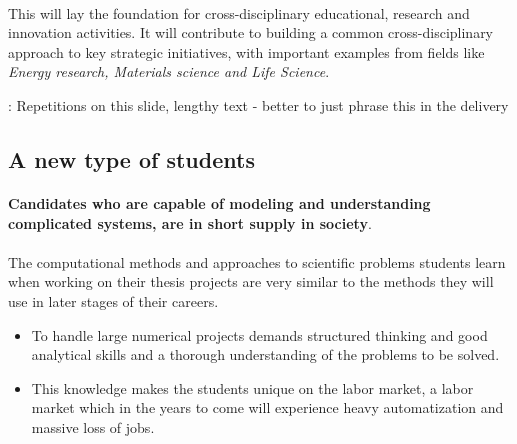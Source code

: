 \documentclass[%
oneside,                 %
final,                   %
10pt]{article}
\newcommand{\shortinlinecomment}[3]{{\color{red}{\bf #1}: #2}}
\begin{document}
\paragraph{}
This will lay the foundation for cross-disciplinary
educational, research and innovation activities. It will contribute to building a common cross-disciplinary
approach to key strategic initiatives, with important examples from fields like  \emph{Energy research, Materials science and  Life Science}.



\shortinlinecomment{hpl 2}{ Repetitions on this slide, lengthy text - better to just phrase this in the delivery }{ Repetitions on this slide, }




\subsection{A new type of students}

\paragraph{}
\textbf{Candidates who are capable of modeling and understanding complicated
systems, are in short supply in society}.



\paragraph{}
The computational methods and approaches to scientific problems students learn
when working on their thesis projects are very similar to the methods
they will use in later stages of their careers.
\begin{itemize}
\item To handle large numerical projects demands structured thinking and good analytical skills and a thorough understanding of the problems to be solved.

\item This knowledge makes the students unique on the labor market, a labor market which in the years to come will experience heavy automatization and massive loss of jobs.
\end{itemize}

\noindent
\end{document}
